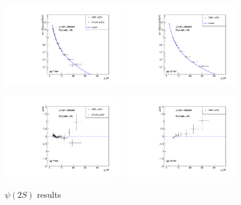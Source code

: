 \documentclass{article}
\begin{document}
\begin{figure}
\centering
\includegraphics[width = 0.45\textwidth]{psiprime_cs.pdf}
\includegraphics[width = 0.45\textwidth]{psiprime_cs_13.pdf}

\includegraphics[width = 0.45\textwidth]{psiprime_pull.pdf}
\includegraphics[width = 0.45\textwidth]{psiprime_pull_13.pdf}
\caption{$\psi(2S)$ results}
\end{figure}

\clearpage
\end{document}
